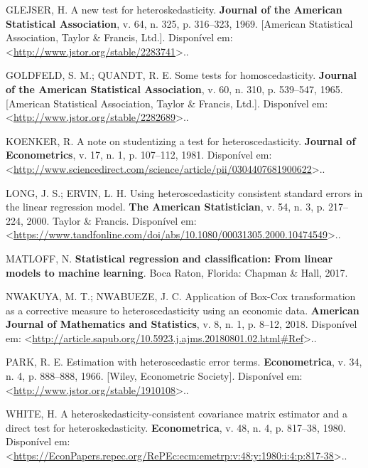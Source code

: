 \documentclass[a4paper, 12pt]{article}
\begin{document}
\leavevmode\hypertarget{ref-glejser}{}%
GLEJSER, H. A new test for heteroskedasticity. \textbf{Journal of the
American Statistical Association}, v. 64, n. 325, p. 316--323, 1969.
{[}American Statistical Association, Taylor \& Francis, Ltd.{]}.
Disponível em:
\textless{}\url{http://www.jstor.org/stable/2283741}\textgreater{}..

\leavevmode\hypertarget{ref-GQ}{}%
GOLDFELD, S. M.; QUANDT, R. E. Some tests for homoscedasticity.
\textbf{Journal of the American Statistical Association}, v. 60, n. 310,
p. 539--547, 1965. {[}American Statistical Association, Taylor \&
Francis, Ltd.{]}. Disponível em:
\textless{}\url{http://www.jstor.org/stable/2282689}\textgreater{}..

\leavevmode\hypertarget{ref-koenker1981}{}%
KOENKER, R. A note on studentizing a test for heteroscedasticity.
\textbf{Journal of Econometrics}, v. 17, n. 1, p. 107--112, 1981.
Disponível em:
\textless{}\url{http://www.sciencedirect.com/science/article/pii/0304407681900622}\textgreater{}..

\leavevmode\hypertarget{ref-Long}{}%
LONG, J. S.; ERVIN, L. H. Using heteroscedasticity consistent standard
errors in the linear regression model. \textbf{The American
Statistician}, v. 54, n. 3, p. 217--224, 2000. Taylor \& Francis.
Disponível em:
\textless{}\url{https://www.tandfonline.com/doi/abs/10.1080/00031305.2000.10474549}\textgreater{}..

\leavevmode\hypertarget{ref-matloff2017}{}%
MATLOFF, N. \textbf{Statistical regression and classification: From
linear models to machine learning}. Boca Raton, Florida: Chapman \&
Hall, 2017.

\leavevmode\hypertarget{ref-nigeria}{}%
NWAKUYA, M. T.; NWABUEZE, J. C. Application of Box-Cox transformation as
a corrective measure to heteroscedasticity using an economic data.
\textbf{American Journal of Mathematics and Statistics}, v. 8, n. 1, p.
8--12, 2018. Disponível em:
\textless{}\url{http://article.sapub.org/10.5923.j.ajms.20180801.02.html\#Ref}\textgreater{}..

\leavevmode\hypertarget{ref-Park}{}%
PARK, R. E. Estimation with heteroscedastic error terms.
\textbf{Econometrica}, v. 34, n. 4, p. 888--888, 1966. {[}Wiley,
Econometric Society{]}. Disponível em:
\textless{}\url{http://www.jstor.org/stable/1910108}\textgreater{}..

\leavevmode\hypertarget{ref-white1980}{}%
WHITE, H. A heteroskedasticity-consistent covariance matrix estimator
and a direct test for heteroskedasticity. \textbf{Econometrica}, v. 48,
n. 4, p. 817--38, 1980. Disponível em:
\textless{}\url{https://EconPapers.repec.org/RePEc:ecm:emetrp:v:48:y:1980:i:4:p:817-38}\textgreater{}..
\end{document}
